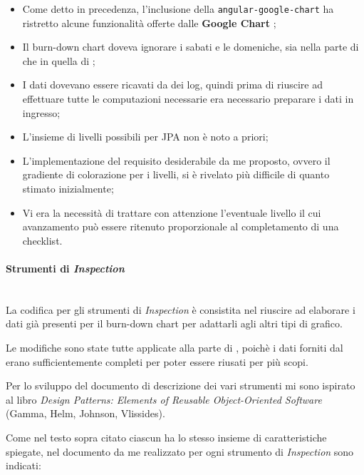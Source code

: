 \begin{itemize}
\item Come detto in precedenza, l'inclusione della 
  \texttt{angular-google-chart} ha ristretto alcune funzionalità offerte dalle
  \textbf{Google Chart };
\item Il burn-down chart doveva ignorare i sabati e le domeniche, sia nella
  parte di \BKEND{} che in quella di \FREND{};
\item I dati dovevano essere ricavati da dei log, quindi prima di riuscire ad
  effettuare tutte le computazioni necessarie era necessario preparare i dati
  in ingresso;
\item L'insieme di livelli possibili per JPA non è noto a priori;
\item L'implementazione del requisito desiderabile da me proposto, ovvero il
  gradiente di colorazione per i livelli, si è rivelato più difficile di
  quanto stimato inizialmente;
\item Vi era la necessità di trattare con attenzione l'eventuale livello il
  cui avanzamento può essere ritenuto proporzionale al completamento di una
  checklist.
\end{itemize}

\paragraph{Strumenti di \emph{Inspection}} \mbox{} \\

La codifica per gli strumenti di \emph{Inspection} è consistita nel riuscire
ad elaborare i dati già presenti per il burn-down chart per adattarli agli
altri tipi di grafico.

Le modifiche sono state tutte applicate alla parte di \FREND{}, poichè i dati
forniti dal \BKEND{} erano sufficientemente completi per poter essere riusati
per più scopi.

Per lo sviluppo del documento di descrizione dei vari strumenti mi sono
ispirato al libro \emph{Design Patterns: Elements of Reusable Object-Oriented
Software} (Gamma, Helm, Johnson, Vlissides).

Come nel testo sopra citato ciascun  ha lo stesso
insieme di caratteristiche spiegate, nel documento da me realizzato per ogni
strumento di \emph{Inspection} sono indicati:

